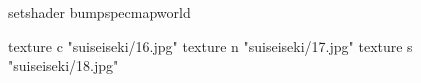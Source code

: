 setshader bumpspecmapworld

    texture c "suiseiseki/16.jpg"
    texture n "suiseiseki/17.jpg"
    texture s "suiseiseki/18.jpg"
